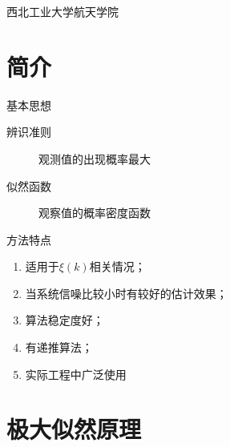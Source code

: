 
\newcommand{\vect}[1]{\boldsymbol{#1}}

\def\lecturename{系统辨识}

\title{\insertlecture}

\author{邢超}

\institute
{
  西北工业大学航天学院
}


\subtitle{}
\date{2012}



\begin{frame}
  \maketitle
\end{frame}


\section{简介}

\begin{frame}{基本思想}
\begin{description}
\item[辨识准则] 观测值的出现概率最大
\item[似然函数] 观察值的概率密度函数
\end{description}
\end{frame}

\begin{frame}{方法特点}
\begin{enumerate}
\item 适用于$\xi(k)$相关情况；
\item 当系统信噪比较小时有较好的估计效果；
\item 算法稳定度好；
\item 有递推算法；
\item 实际工程中广泛使用
\end{enumerate}
\end{frame}

\section{极大似然原理}


